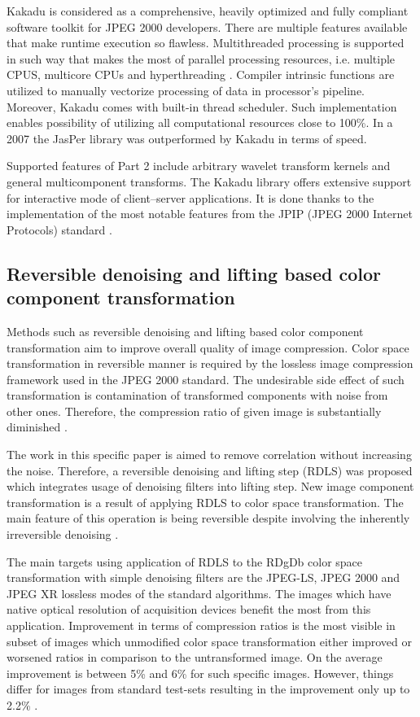 Kakadu is considered as a comprehensive, heavily optimized and fully compliant software toolkit for JPEG 2000
developers. There are multiple features available that make runtime execution so flawless. Multithreaded
processing is supported in such way that makes the most of parallel processing resources, i.e. multiple CPUS,
multicore CPUs and hyperthreading \cite{jpeg_suite}. Compiler intrinsic functions are utilized to manually
vectorize processing of data in processor's pipeline. Moreover, Kakadu comes with built-in thread scheduler.
Such implementation enables possibility of utilizing all computational resources close to 100\%.
In a 2007 the JasPer library was outperformed by Kakadu in terms of speed.

Supported features of Part 2 include arbitrary wavelet transform kernels and general multicomponent transforms.
The Kakadu library offers extensive support for interactive mode of client–server applications. It is done
thanks to the implementation of the most notable features from the JPIP (JPEG 2000 Internet Protocols) standard \cite{jpeg_suite}.

\subsection{Reversible denoising and lifting based color component transformation}

Methods such as reversible denoising and lifting based color component transformation aim to improve
overall quality of image compression. Color space transformation in reversible manner is required
by the lossless image compression framework used in the JPEG 2000 standard. The undesirable side effect
of such transformation is contamination of transformed components with noise from other ones.
Therefore, the compression ratio of given image is substantially diminished \cite{denoising}.

The work in this specific paper is aimed to remove correlation without increasing the noise.
Therefore, a reversible denoising and lifting step (RDLS) was proposed which integrates
usage of denoising filters into lifting step. New image component transformation is a result
of applying RDLS to color space transformation. The main feature of this operation is
being reversible despite involving the inherently irreversible denoising \cite{denoising}.

The main targets using application of RDLS to the RDgDb color space transformation with
simple denoising filters are the JPEG-LS, JPEG 2000 and JPEG XR lossless modes of the
standard algorithms.
The images which have native optical resolution of acquisition devices benefit the most
from this application. Improvement in terms of compression ratios is the most visible
in subset of images which unmodified color space transformation either improved or worsened
ratios in comparison to the untransformed image. On the average improvement is between
5\% and 6\% for such specific images. However, things differ for images from standard
test-sets resulting in the improvement only up to 2.2\% \cite{denoising}.



